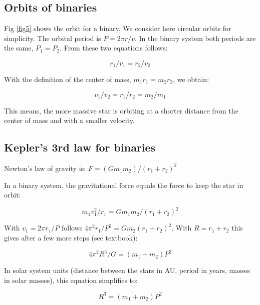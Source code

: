 \subsection{Orbits of binaries}

Fig \ref{fig5} shows the orbit for a binary. We consider here circular orbits for simplicity. The orbital period is $P = 2 \pi r / v$. In the binary system both periods are the same, $P_1 = P_2$. From these two equations follows:

\begin{equation}
r_1 / v_1 = r_2 / v_2
\label{eq8}
\end{equation}

With the definition of the center of mass, $m_1 r_1 = m_2 r_2$, we obtain:

\begin{equation}
v_1 / v_2 = r_1 / r_2 = m_2 / m_1
\label{eq9}
\end{equation}

This means, the more massive star is orbiting at a shorter distance from the center of mass and with a smaller velocity.

\subsection{Kepler's 3rd law for binaries}

Newton's law of gravity is: $F = (G m_1 m_2) / (r_1 + r_2)^2$

In a binary system, the gravitational force equals the force to keep the star in orbit: 

\begin{equation}
m_1 v_1^2 / r_1 = G m_1 m_2 / (r_1 + r_2)^2
\label{eq10}
\end{equation}

With $v_1 = 2 \pi r_1 / P$ follows $4 \pi^2 r_1 / P^2 = G m_2 (r_1 + r_2)^2$. With $R = r_1 + r_2$ this gives after a few more steps (see textbook):

\begin{equation}
4 \pi^2 R^3 / G = (m_1 + m_2) P^2
\label{eq11}
\end{equation}

In solar system units (distance between the stars in AU, period in years, masses in solar masses), this equation simplifies to:

\begin{equation}
R^3 = (m_1 + m_2) P^2
\label{eq12}
\end{equation}

